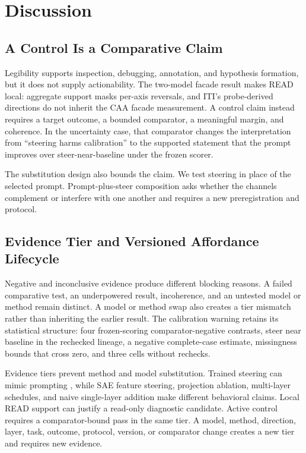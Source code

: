 \documentclass[sigconf]{acmart}
\begin{document}
\section{Discussion}
\label{sec:discussion}

\subsection{A Control Is a Comparative Claim}

Legibility supports inspection, debugging, annotation, and hypothesis formation, but it does not supply actionability. The two-model facade result makes READ local: aggregate support masks per-axis reversals, and ITI's probe-derived directions do not inherit the CAA facade measurement. A control claim instead requires a target outcome, a bounded comparator, a meaningful margin, and coherence. In the uncertainty case, that comparator changes the interpretation from ``steering harms calibration'' to the supported statement that the prompt improves over steer-near-baseline under the frozen scorer.

The substitution design also bounds the claim. We test steering in place of the selected prompt. Prompt-plus-steer composition asks whether the channels complement or interfere with one another and requires a new preregistration and protocol.

\subsection{Evidence Tier and Versioned Affordance Lifecycle}

Negative and inconclusive evidence produce different blocking reasons. A failed comparative test, an underpowered result, incoherence, and an untested model or method remain distinct. A model or method swap also creates a tier mismatch rather than inheriting the earlier result. The calibration warning retains its statistical structure: four frozen-scoring comparator-negative contrasts, steer near baseline in the rechecked lineage, a negative complete-case estimate, missingness bounds that cross zero, and three cells without rechecks.

Evidence tiers prevent method and model substitution. Trained steering can mimic prompting \cite{heyman2026steer}, while SAE feature steering, projection ablation, multi-layer schedules, and naive single-layer addition make different behavioral claims. Local READ support can justify a read-only diagnostic candidate. Active control requires a comparator-bound pass in the same tier. A model, method, direction, layer, task, outcome, protocol, version, or comparator change creates a new tier and requires new evidence.
\end{document}
